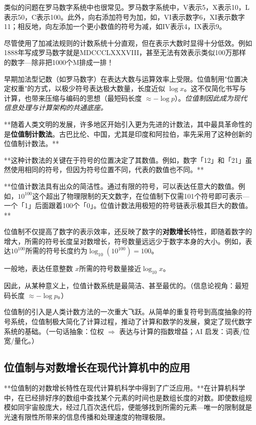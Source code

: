 类似的问题在罗马数字系统中也很常见。罗马数字系统中，V表示5，X表示10，L表示50，C表示100。此外，向右添加符号为加，如，VI表示数字6，XI表示数字11；相反地，向左添加一个更小数值的符号为减，如IV表示4，IX表示9。

尽管使用了加减法规则的计数系统十分直观，但在表示大数时显得十分低效。例如1888年写成罗马数字就是MDCCCLXXXVIII，甚至无法有效表示类似100万那样的数字---除非把1000个M排成一排！

早期加法型记数（如罗马数字）在表达大数与运算效率上受限。位值制用"位置决定权重"的方式，以极少符号表达极大数量，长度近似 $\log x$。这不仅简化书写与计算，也带来压缩与编码的思想（最短码长度 $\approx-\log p$）。\emph{位值制因此成为现代信息处理与计算架构的共通底座。}

**随着人类文明的发展，许多地区开始引入更为先进的计数法，其中最具革命性的是{\bf 位值制计数法}。古巴比伦、中国，尤其是印度和阿拉伯，率先采用了这种创新的位值制计数法。**

**这种计数法的关键在于符号的位置决定了其数值。例如，数字「12」和「21」虽然使用相同的符号，但因为符号位置不同，代表的数值也不同。**

**位值计数法具有出众的简洁性。通过有限的符号，可以表达任意大的数值。例如，$10^{100}$这个超出了物理限制的天文数字，在位值制下仅需101个符号即可表示---一个「1」后面跟着100个「0」。位值计数法用极短的符号链表示极其巨大的数值。**

位值制不仅提高了数字的表示效率，还反映了数字的{\bf 对数增长}特性，即随着数字的增大，所需的符号长度呈对数增长，符号数量远远少于数字本身的大小。例如，表达$10^{100}$所需的符号长度约为$\log_{10}(10^{100})=100$。

一般地，表达任意整数 $x$所需的符号数量接近${\log_{10} x}$。

因此，从某种意义上，位值计数系统是最简洁、甚至最优的。{（信息论视角：最短码长度 $\approx -\log p$。）}

位值制的引入是人类计数方法的一次重大飞跃。从简单的重复符号到高度抽象的符号系统，位值制极大简化了计算过程，推动了计算和数学的发展，奠定了现代数字系统的基础。{（一句话抽象：位权 $\Rightarrow$ 表达与计算的指数增益；AI 启发：词表/位宽/量化。）}

\subsection{位值制与对数增长在现代计算机中的应用}

**位值制的对数增长特性在现代计算机科学中得到了广泛应用。**在计算机科学中，在已经排好序的数组中查找某个元素的时间也是数组长度的对数。即使数组规模如同宇宙般庞大，经过几百次迭代后，便能够找到所需的元素---唯一的限制就是光速有限性所带来的信息传播和处理速度的物理极限。


